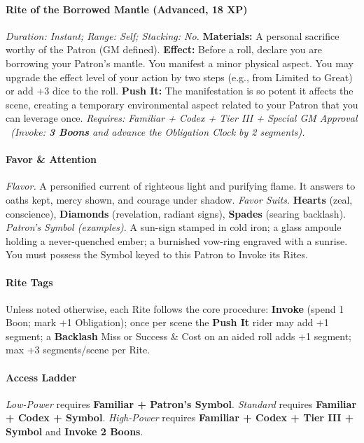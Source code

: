 \documentclass[12pt,twoside]{book}
\begin{document}
\paragraph{Rite of the Borrowed Mantle (Advanced, 18 XP)} \emph{Duration: Instant; Range: Self; Stacking: No.}
\textbf{Materials:} A personal sacrifice worthy of the Patron (GM defined).
\textbf{Effect:} Before a roll, declare you are borrowing your Patron's mantle. You manifest a minor physical aspect. You may upgrade the effect level of your action by two steps (e.g., from Limited to Great) or add +3 dice to the roll.
\textbf{Push It:} The manifestation is so potent it affects the scene, creating a temporary environmental aspect related to your Patron that you can leverage once.
\emph{Requires: Familiar + Codex + Tier III + Special GM Approval \ (\textit{Invoke:} \textbf{3 Boons} and advance the Obligation Clock by 2 segments).}


\paragraph{Favor \& Attention}
\emph{Flavor.} A personified current of righteous light and purifying flame. It answers to oaths kept, mercy shown, and courage under shadow.  
\emph{Favor Suits.} \textbf{Hearts} (zeal, conscience), \textbf{Diamonds} (revelation, radiant signs), \textbf{Spades} (searing backlash).  
\emph{Patron’s Symbol (examples).} A sun-sign stamped in cold iron; a glass ampoule holding a never-quenched ember; a burnished vow-ring engraved with a sunrise. You must possess the Symbol keyed to this Patron to Invoke its Rites.

\paragraph{Rite Tags}
Unless noted otherwise, each Rite follows the core procedure: \textbf{Invoke} (spend 1 Boon; mark +1 Obligation); once per scene the \textbf{Push It} rider may add +1 segment; a \textbf{Backlash} Miss or Success \& Cost on an aided roll adds +1 segment; max +3 segments/scene per Rite.

\paragraph{Access Ladder}
\emph{Low-Power} requires \textbf{Familiar + Patron’s Symbol}. \;\;
\emph{Standard} requires \textbf{Familiar + Codex + Symbol}. \;\;
\emph{High-Power} requires \textbf{Familiar + Codex + Tier III + Symbol} and \textbf{Invoke 2 Boons}.
\end{document}
